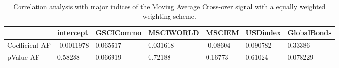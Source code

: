 \begin{table}[H]
\centering
\begin{tabular}{lllllll}
\hline& intercept & GSCICommo & MSCIWORLD & MSCIEM & USDindex & GlobalBonds \\ 
\hline 
Coefficient AF & -0.0011978 & 0.065617 & 0.031618 & -0.08604 & 0.090782 & 0.33386 \\ 
pValue AF & 0.58288 & 0.066919 & 0.72188 & 0.16773 & 0.61024 & 0.078229 \\ 
\hline
\end{tabular}
\caption{Correlation analysis with major indices of the Moving Average Cross-over signal with a equally weighted weighting scheme.}
\label{MAEW_AFACTOR}
\end{table}